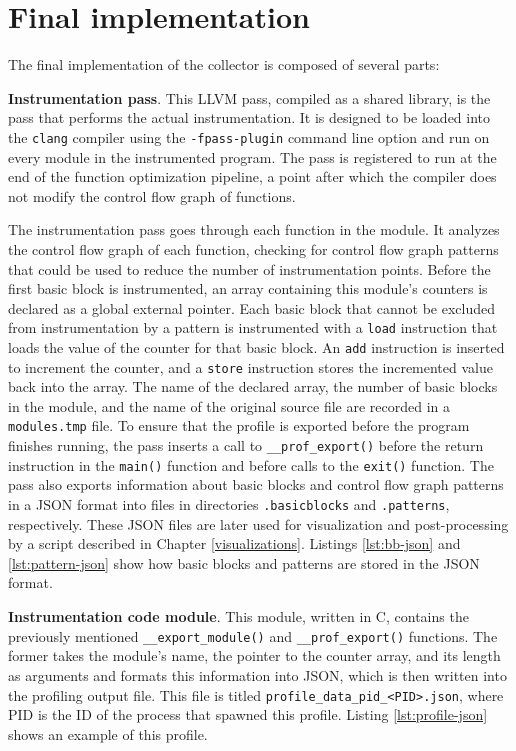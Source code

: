 \section{Final implementation}

The final implementation of the collector is composed of several parts:

\medskip
\noindent
\textbf{Instrumentation pass}. This LLVM pass, compiled as a shared library, is the pass that performs the actual instrumentation. It is designed to be loaded into the \texttt{clang} compiler using the \texttt{-fpass-plugin} command line option and run on every module in the instrumented program. The pass is registered to run at the end of the function optimization pipeline, a point after which the compiler does not modify the control flow graph of functions. 

The instrumentation pass goes through each function in the module. It analyzes the control flow graph of each function, checking for control flow graph patterns that could be used to reduce the number of instrumentation points. Before the first basic block is instrumented, an array containing this module's counters is declared as a global external pointer. Each basic block that cannot be excluded from instrumentation by a pattern is instrumented with a \texttt{load} instruction that loads the value of the counter for that basic block. An \texttt{add} instruction is inserted to increment the counter, and a \texttt{store} instruction stores the incremented value back into the array. The name of the declared array, the number of basic blocks in the module, and the name of the original source file are recorded in a \texttt{modules.tmp} file. To ensure that the profile is exported before the program finishes running, the pass inserts a call to \texttt{\_\_prof\_export()} before the return instruction in the \texttt{main()} function and before calls to the \texttt{exit()} function. The pass also exports information about basic blocks and control flow graph patterns in a JSON format into files in directories \texttt{.basicblocks} and \texttt{.patterns}, respectively. These JSON files are later used for visualization and post-processing by a script described in Chapter \ref{visualizations}.  Listings \ref{lst:bb-json} and \ref{lst:pattern-json} show how basic blocks and patterns are stored in the JSON format.

 
\medskip
\noindent
\textbf{Instrumentation code module}. This module, written in C, contains the previously mentioned \texttt{\_\_export\_module()} and \texttt{\_\_prof\_export()} functions. The former takes the module's name, the pointer to the counter array, and its length as arguments and formats this information into JSON, which is then written into the profiling output file. This file is titled \texttt{profile\_data\_pid\_<PID>.json}, where PID is the ID of the process that spawned this profile. Listing \ref{lst:profile-json} shows an example of this profile.


